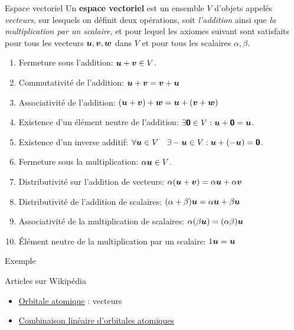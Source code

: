 \documentclass[french, handout]{beamer}
\begin{document}
\begin{frame}{Espace vectoriel}
Un \textbf{espace vectoriel} est un ensemble $V$ d'objets appelés \textit{vecteurs}, sur lesquels on définit
deux opérations, soit \textit{l'addition} ainsi que \textit{la multiplication par un scalaire}, et pour lequel
les axiomes suivant sont satisfaits pour tous les vecteurs $\boldsymbol{u}, \boldsymbol{v}, \boldsymbol{w}$ dans $V$
et pour tous les scalaires $\alpha, \beta$.
\begin{enumerate}
\item Fermeture sous l'addition: $\boldsymbol{u}+\boldsymbol{v}\in V$.
\item Commutativité de l'addition: $\boldsymbol{u} + \boldsymbol{v} = \boldsymbol{v} + \boldsymbol{u}$
\item Associativité de l'addition: $ (\boldsymbol{u} + \boldsymbol{v}) + \boldsymbol{w} = \boldsymbol{u} + (\boldsymbol{v} + \boldsymbol{w})$
\item Existence d'un élément neutre de l'addition: $\exists\mbox{\textsf{\textbf{{0}}}}\in V:  \boldsymbol{u} + \mbox{\textsf{\textbf{{0}}}} = \boldsymbol{u}$.
\item Existence d'un inverse additif: $\forall \boldsymbol{u}\in V\quad \exists-\boldsymbol{u}\in V: \boldsymbol{u} + (-\boldsymbol{u}) = \mbox{\textsf{\textbf{{0}}}}$.
\item Fermeture sous la multiplication: $\alpha\boldsymbol{u} \in V$.
\item Distributivité sur l'addition de vecteurs: $\alpha(\boldsymbol{u} + \boldsymbol{v}) = \alpha\boldsymbol{u} + \alpha\boldsymbol{v}$
\item Distributivité de l'addition de scalaires: $ (\alpha + \beta)\boldsymbol{u} = \alpha\boldsymbol{u} + \beta\boldsymbol{u}$
\item Associativité de la multiplication de scalaires: $\alpha(\beta\boldsymbol{u}) = (\alpha\beta)\boldsymbol{u}$
\item Élément neutre de la multiplication par un scalaire: $1\boldsymbol{u} = \boldsymbol{u}$
\end{enumerate}
\end{frame}

\begin{frame}{Exemple}

Articles sur Wikipédia
\begin{itemize}
\item \href{https://fr.wikipedia.org/wiki/Orbitale_atomique}{Orbitale atomique} : vecteurs
\item \href{https://fr.wikipedia.org/wiki/Combinaison_lin\%C3\%A9aire_d\%27orbitales_atomiques}{Combinaison linéaire d'orbitales atomiques}
\end{itemize}

\end{frame}
\end{document}
